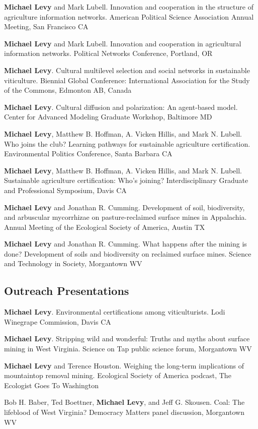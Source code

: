 \begin{description}
\tightlist
\item[2015]
\textbf{Michael Levy} and Mark Lubell. Innovation and cooperation in the
structure of agriculture information networks. American Political
Science Association Annual Meeting, San Francisco CA
\item[2015]
\textbf{Michael Levy} and Mark Lubell. Innovation and cooperation in
agricultural information networks. Political Networks Conference,
Portland, OR
\item[2015]
\textbf{Michael Levy}. Cultural multilevel selection and social networks
in sustainable viticulture. Biennial Global Conference: International
Association for the Study of the Commons, Edmonton AB, Canada
\item[2014]
\textbf{Michael Levy}. Cultural diffusion and polarization: An
agent-based model. Center for Advanced Modeling Graduate Workshop,
Baltimore MD
\item[2014]
\textbf{Michael Levy}, Matthew B. Hoffman, A. Vicken Hillis, and Mark N.
Lubell. Who joins the club? Learning pathways for sustainable
agriculture certification. Environmental Politics Conference, Santa
Barbara CA
\item[2014]
\textbf{Michael Levy}, Matthew B. Hoffman, A. Vicken Hillis, and Mark N.
Lubell. Sustainable agriculture certification: Who's joining?
Interdisciplinary Graduate and Professional Symposium, Davis CA
\item[2011]
\textbf{Michael Levy} and Jonathan R. Cumming. Development of soil,
biodiversity, and arbuscular mycorrhizae on pasture-reclaimed surface
mines in Appalachia. Annual Meeting of the Ecological Society of
America, Austin TX
\item[2011]
\textbf{Michael Levy} and Jonathan R. Cumming. What happens after the
mining is done? Development of soils and biodiversity on reclaimed
surface mines. Science and Technology in Society, Morgantown WV
\end{description}

\subsection{Outreach Presentations}\label{outreach-presentations}

\begin{description}
\tightlist
\item[2014]
\textbf{Michael Levy}. Environmental certifications among
viticulturists. Lodi Winegrape Commission, Davis CA
\item[2012]
\textbf{Michael Levy}. Stripping wild and wonderful: Truths and myths
about surface mining in West Virginia. Science on Tap public science
forum, Morgantown WV
\item[2011]
\textbf{Michael Levy} and Terence Houston. Weighing the long-term
implications of mountaintop removal mining. Ecological Society of
America podcast, The Ecologist Goes To Washington
\item[2011]
Bob H. Baber, Ted Boettner, \textbf{Michael Levy}, and Jeff G. Skousen.
Coal: The lifeblood of West Virginia? Democracy Matters panel
discussion, Morgantown WV
\end{description}

